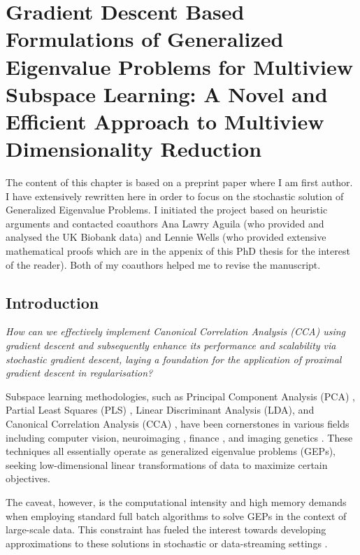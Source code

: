 \chapter{Gradient Descent Based Formulations of Generalized Eigenvalue Problems for Multiview Subspace Learning: A Novel and Efficient Approach to Multiview Dimensionality Reduction}\label{gradient descent}

The content of this chapter is based on a preprint paper where I am first author. I have extensively rewritten here in order to focus on the stochastic solution of Generalized Eigenvalue Problems. I initiated the project based on heuristic arguments and contacted coauthors Ana Lawry Aguila (who provided and analysed the UK Biobank data) and Lennie Wells (who provided extensive mathematical proofs which are in the appenix of this PhD thesis for the interest of the reader). Both of my coauthors helped me to revise the manuscript.

\section{Introduction} %

\textit{How can we effectively implement Canonical Correlation Analysis (CCA) using gradient descent and subsequently enhance its performance and scalability via stochastic gradient descent, laying a foundation for the application of proximal gradient descent in regularisation?}

Subspace learning methodologies, such as Principal Component Analysis (PCA) \cite{hotelling1933analysis}, Partial Least Squares (PLS) \cite{haenlein2004beginner}, Linear Discriminant Analysis (LDA), and Canonical Correlation Analysis (CCA) \cite{hotelling1992relations}, have been cornerstones in various fields including computer vision, neuroimaging \cite{Krishnan2011}, finance \cite{cassel2000measurement}, and imaging genetics \cite{Hansen2021}. These techniques all essentially operate as generalized eigenvalue problems (GEPs), seeking low-dimensional linear transformations of data to maximize certain objectives.

The caveat, however, is the computational intensity and high memory demands when employing standard full batch algorithms to solve GEPs in the context of large-scale data. This constraint has fueled the interest towards developing approximations to these solutions in stochastic or data-streaming settings \cite{arora2012stochastic}.

